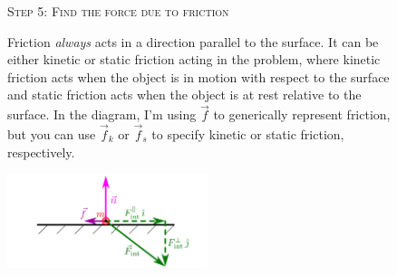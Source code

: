 \documentclass[10pt,letterpaper,twoside]{article}
\begin{document}
\begin{figure}[h!]
  \begin{minipage}[l]{0.70\textwidth}
	{\Large\textsc{Step 5}:} {\large\textsc{Find the force due to friction}}{\quad}

	Friction \textit{always} acts in a direction parallel to the surface.
	It can be either kinetic or static friction acting in the problem, where kinetic friction acts when the object is in motion with respect to the surface and static friction acts when the object is at rest relative to the surface.
	In the diagram, I'm using $\vec f$ to generically represent friction, but you can use $\vec f_k$ or $\vec f_s$ to specify kinetic or static friction, respectively.
  \end{minipage}
  \begin{minipage}[c]{0.25\textwidth}
	\includegraphics[keepaspectratio=true,width=2.30in]{./how_to_normal_force_and_friction_f05.pdf}
    \label{fig:05}
  \end{minipage}
\end{figure}
\FloatBarrier
\end{document}
